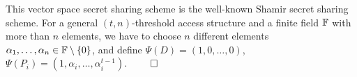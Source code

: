 This vector space secret sharing scheme is the well-known Shamir secret sharing scheme.
For a general $(t, n)$-threshold access structure and a finite field $\mathbb{F}$ with more than $n$ elements, we have to choose $n$ different elements $\alpha_1,\ldots,\alpha_n \in \mathbb{F}\setminus\{0\}$, and define $\Psi(D) = (1,0, \ldots, 0)$, $\Psi(P_i) = (1, \alpha_i, \ldots, \alpha_i^{t-1})$. \hfill $\qed$

